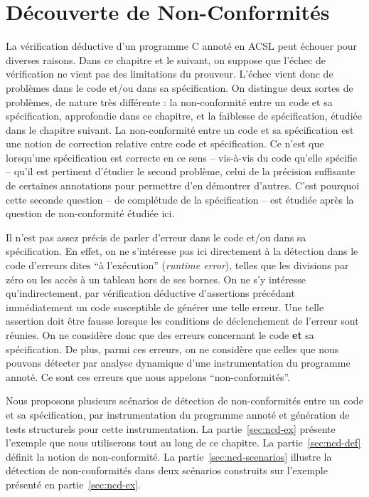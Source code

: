 
\chapter{Découverte de Non-Conformités}
\label{sec:ncd}

\chapterintro



La vérification déductive d'un programme C annoté en ACSL peut échouer pour
diverses raisons. Dans ce chapitre et le suivant, on suppose que l'échec de
vérification ne vient pas des limitations du prouveur. L'échec vient donc de
problèmes dans le code et/ou dans sa spécification. On distingue deux sortes de
problèmes, de nature très différente : la non-conformité entre un code et sa
spécification, approfondie dans ce chapitre, et la faiblesse de spécification,
étudiée dans le chapitre suivant. La non-conformité entre un code et sa
spécification est une notion de correction relative entre code et spécification.
Ce n'est que lorsqu'une spécification est correcte en ce sens -- vis-à-vis du
code qu'elle spécifie -- qu'il est pertinent d'étudier le second problème, celui
de la précision suffisante de certaines annotations pour permettre d'en
démontrer d'autres. C'est pourquoi cette seconde question -- de complétude de la
spécification -- est étudiée après la question de non-conformité étudiée ici.

Il n'est pas assez précis de parler d'erreur dans le code et/ou dans sa
spécification. En effet, on ne s'intéresse pas ici directement à la détection
dans le code d'erreurs dites ``à l'exécution'' (\textit{runtime error}), telles
que les divisions par zéro ou les accès à un tableau hors de ses bornes. On ne
s'y intéresse qu'indirectement, par vérification déductive d'assertions
précédant immédiatement un code susceptible de générer une telle erreur.
Une telle assertion doit être fausse lorsque les conditions de déclenchement de
l'erreur sont réunies. On ne considère donc que des erreurs concernant le code
\textbf{et} sa spécification. De plus, parmi ces erreurs, on ne considère que
celles que nous pouvons détecter par analyse dynamique d'une instrumentation du
programme annoté. Ce sont ces erreurs que nous appelons ``non-conformités''.

Nous proposons plusieurs scénarios de détection de non-conformités entre un code
et sa spécification, par instrumentation du programme annoté et génération de
tests structurels pour cette instrumentation.
La partie~\ref{sec:ncd-ex} présente l'exemple que nous utiliserons tout au long
de ce chapitre. La partie~\ref{sec:ncd-def} définit la notion de non-conformité.
La partie~\ref{sec:ncd-scenarios} illustre la détection de non-conformités dans
deux scénarios construits sur l'exemple présenté en partie~\ref{sec:ncd-ex}.



